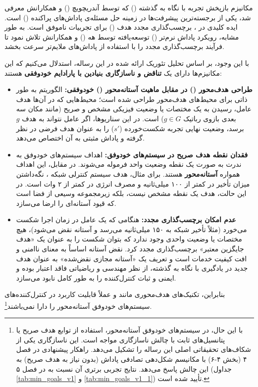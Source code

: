 \documentclass[oneside,openany,phd]{TMU-Thesis}
\begin{document}
مکانیزم بازپخش تجربه با نگاه به گذشته () که توسط آندریچویچ () و همکارانش \cite{andrychowicz2017her} معرفی شد، یکی از برجسته‌ترین پیشرفت‌ها در زمینه حل مسئله‌ی پاداش‌های پراکنده () است. ایده کلیدی در ، برچسب‌گذاری مجدد هدف () برای تجربیات ناموفق است. به طور مشابه، رویکرد پاداش نرم‌تر () توسعه‌یافته توسط هه () و همکارانش \cite{he2020softher} تلاش نمود تا فرآیند برچسب‌گذاری مجدد را با استفاده از پاداش‌های ملایم‌تر سرعت بخشد.

با این وجود، بر اساس تحلیل تئوریک ارائه شده در این رساله، استدلال می‌کنیم که این مکانیزم‌ها دارای یک \textbf{تناقض و ناسازگاری بنیادین با پارادایم خودوفقی} هستند:
\begin{itemize}
    \item \textbf{طراحی هدف‌محور () در مقابل ماهیت آستانه‌محور () خودوفقی:} الگوریتم  به طور ذاتی برای محیط‌های هدف‌محور طراحی شده است؛ محیط‌هایی که در آن‌ها هدف عامل، رسیدن به یک مختصات یا وضعیت فیزیکی مشخص و صریح (مانند مکان سه بعدی بازوی رباتیک $g \in G$) است. در این سناریوها، اگر عامل نتواند به هدف $g$ برسد،  وضعیت نهایی تجربه شکست‌خورده ($s'$) را به عنوان هدف فرضی در نظر گرفته و پاداش مثبتی به آن اختصاص می‌دهد.
    \item \textbf{فقدان نقطه هدف صریح در سیستم‌های خودوفق:} اهداف سیستم‌های خودوفق به ندرت به صورت یک نقطه وضعیت واحد فرموله می‌شوند. در مقابل، این اهداف همواره \textbf{آستانه‌محور} هستند. برای مثال، هدف سیستم کنترلی شبکه ، نگه‌داشتن میزان تأخیر در کمتر از ۱۰۰ میلی‌ثانیه و مصرف انرژی در کمتر از ۲ وات است. در این حالت، هدف یک نقطه مشخص نیست، بلکه زیرمجموعه وسیعی از فضا است که قیود آستانه‌ای را ارضا می‌سازد.
    \item \textbf{عدم امکان برچسب‌گذاری مجدد:} هنگامی که یک عامل در زمان اجرا شکست می‌خورد (مثلاً تأخیر شبکه به ۱۵۰ میلی‌ثانیه می‌رسد و آستانه نقض می‌شود)، هیچ مختصات یا وضعیت واحدی وجود ندارد که بتوان شکست را به عنوان یک «هدف جایگزین معتبر» برچسب‌گذاری مجدد کرد. نقض آستانه اساساً به معنای ناامنی و افت کیفیت خدمات است و تعریف یک «آستانه مجازی نقض‌شده» به عنوان هدف جدید در یادگیری با نگاه به گذشته، از نظر مهندسی و ریاضیاتی فاقد اعتبار بوده و ایمنی و ثبات کنترل‌کننده را به طور کامل نابود می‌سازد.
\end{itemize}

بنابراین، تکنیک‌های هدف‌محوری مانند  و  عملاً قابلیت کاربرد در کنترل‌کننده‌های سیستم‌های خودوفق آستانه‌محور را دارا نمی‌باشند\footnote{با این حال، در سیستم‌های خودوفق آستانه‌محور، استفاده از توابع هدف صریح یا پتانسیل‌های ثابت با چالش ناسازگاری مواجه است. این ناسازگاری یکی از شکاف‌های تحقیقاتی اصلی این رساله را تشکیل می‌دهد. راهکار پیشنهادی  در فصل ۴ (بخش ۴-۶) با مکانیسم شکل‌دهی تصادفی پاداش (بدون نیاز به هدف صریح) به این چالش پاسخ می‌دهد. نتایج تجربی برتری آن نسبت به  در فصل ۵ (جداول \ref{tab:min_goals_v1} و \ref{tab:min_goals_v1_1}) تأیید شده است.}.
\end{document}
